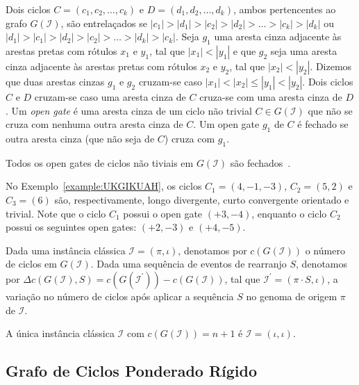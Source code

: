 Dois ciclos $C = (c_1, c_2, \ldots, c_k)$ e $D = (d_1, d_2, \ldots, d_k)$, ambos pertencentes ao grafo $G(\mathcal{I})$, são entrelaçados se $|c_1| > |d_1| > |c_2|  > |d_2| > \ldots > |c_k| > |d_k|$ ou $|d_1| > |c_1| > |d_2|  > |c_2| > \ldots > |d_k| > |c_k|$. Seja $g_1$ uma aresta cinza adjacente às arestas pretas com rótulos $x_1$ e $y_1$, tal que $|x_1| < |y_1|$ e que $g_2$ seja uma aresta cinza adjacente às arestas pretas com rótulos $x_2$ e $y_2$, tal que $|x_2| < |y_2|$. Dizemos que duas arestas cinzas $g_1$ e $g_2$ cruzam-se caso $|x_1| < |x_2| \le |y_1| < |y_2|$. Dois ciclos $C$ e $D$ cruzam-se caso uma aresta cinza de $C$ cruza-se com uma aresta cinza de $D$. Um \emph{open gate} é uma aresta cinza de um ciclo não trivial $C \in G(\mathcal{I})$ que não se cruza com nenhuma outra aresta cinza de $C$. Um open gate $g_1$ de $C$ é fechado se outra aresta cinza (que não seja de $C$) cruza com $g_1$.

\begin{remark}\label{remark:JBJWNCKF}
Todos os open gates de ciclos não tiviais em $G(\mathcal{I})$ são fechados~\cite{2019a-oliveira-etal}.
\end{remark}

No Exemplo~\ref{example:UKGIKUAH}, os ciclos $C_1=(4,-1,-3)$, $C_2 = (5,2)$ e $C_3 = (6)$ são, respectivamente, longo divergente, curto convergente orientado e trivial. Note que o ciclo $C_1$ possui o open gate $({+3},{-4})$, enquanto o ciclo $C_2$ possui os seguintes open gates: $({+2},{-3})$ e $({+4},{-5})$.

Dada uma instância clássica $\mathcal{I} = (\pi,\iota)$, denotamos por $c(G(\mathcal{I}))$ o número de ciclos em $G(\mathcal{I})$. Dada uma sequência de eventos de rearranjo $S$, denotamos por $\Delta c(G(\mathcal{I}), S) = c(G(\mathcal{I^{\prime}})) - c(G(\mathcal{I}))$, tal que $\mathcal{I^{\prime}} = (\pi \cdot S,\iota)$, a variação no número de ciclos após aplicar a sequência $S$ no genoma de origem $\pi$ de $\mathcal{I}$.

\begin{remark}\label{remark:OYRVGHTB}
  A única instância clássica $\mathcal{I}$ com $c(G(\mathcal{I})) = n + 1$ é $\mathcal{I} = (\iota,\iota)$.
\end{remark}

\subsection{Grafo de Ciclos Ponderado Rígido}

